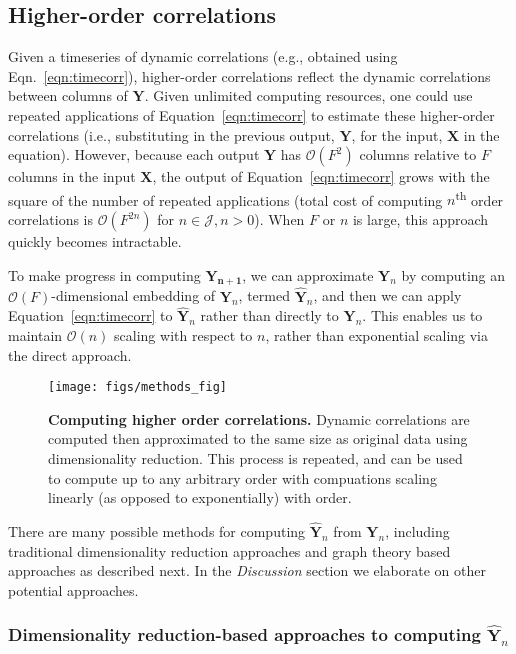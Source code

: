 \documentclass[english]{article}
\begin{document}
\subsection*{Higher-order correlations}
Given a timeseries of dynamic correlations (e.g., obtained using
Eqn.~\ref{eqn:timecorr}), higher-order correlations reflect the
dynamic correlations between columns of $\mathbf{Y}$.  Given unlimited
computing resources, one could use repeated applications of
Equation~\ref{eqn:timecorr} to estimate these higher-order
correlations (i.e., substituting in the previous output, $\mathbf{Y}$,
for the input, $\mathbf{X}$ in the equation).  However, because each
output $\mathbf{Y}$ has $\mathcal{O}(F^2)$ columns relative to $F$ columns in
the input $\mathbf{X}$, the output of Equation~\ref{eqn:timecorr}
grows with the square of the number of repeated applications (total
cost of computing $n$\textsuperscript{th} order correlations is
$\mathcal{O}(F^{2n})$ for $n \in \mathcal{J}, n > 0$).  When $F$ or $n$ is large,
this approach quickly becomes intractable.

To make progress in computing $\mathbf{Y_{n+1}}$, we can approximate
$\mathbf{Y}_n$ by computing an $\mathcal{O}(F)$-dimensional embedding of
$\mathbf{Y}_n$, termed $\hat{\mathbf{Y}}_n$, and then we can apply
Equation~\ref{eqn:timecorr} to $\hat{\mathbf{Y}}_n$ rather than
directly to $\mathbf{Y}_n$.  This enables us to maintain $\mathcal{O}(n)$
scaling with respect to $n$, rather than exponential scaling via the
direct approach.

\begin{figure}
  \centering
  \texttt{[image: figs/methods\_fig]}
  \caption{\textbf{Computing higher order correlations. } Dynamic
    correlations
  are computed then approximated to the same size as original data
  using dimensionality reduction.
  This process is repeated, and can be used to compute up to any
  arbitrary order with compuations scaling linearly (as opposed to exponentially) with order. }
  \label{fig:methods_fig}
\end{figure}


There are many possible methods for computing $\hat{\mathbf{Y}}_n$
from $\mathbf{Y}_n$, including traditional dimensionality reduction
approaches and graph theory based approaches as described next.  In the
\textit{Discussion} section we elaborate on other potential approaches.

\subsubsection*{Dimensionality reduction-based approaches to computing
  $\hat{\mathbf{Y}}_n$}
\end{document}

